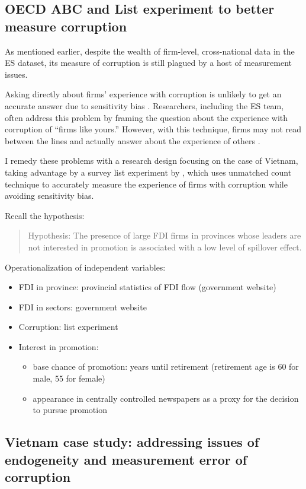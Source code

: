 \subsection{OECD ABC and List experiment to better measure corruption}

As mentioned earlier, despite the wealth of firm-level, cross-national data in the ES dataset, its measure of corruption is still plagued by a host of measurement issues. 

Asking directly about firms' experience with corruption is unlikely to get an accurate answer due to sensitivity bias \citep{Coutts2011}. Researchers, including the ES team, often address this problem by framing the question about the experience with corruption of ``firms like yours.'' However, with this technique, firms may not read between the lines and actually answer about the experience of others \citep{Ahart2004}.

I remedy these problems with a research design focusing on the case of Vietnam, taking advantage by a survey list experiment by \citet{Malesky2015}, which uses unmatched count technique to accurately measure the experience of firms with corruption while avoiding sensitivity bias.

Recall the hypothesis:

\begin{quote}
Hypothesis: The presence of large FDI firms in provinces whose leaders are not interested in promotion is associated with a low level of spillover effect.
\end{quote}

Operationalization of independent variables:
\begin{itemize}
\item FDI in province: provincial statistics of FDI flow (government website)
\item FDI in sectors: government website
\item Corruption: list experiment \citep{Malesky2015}
\item Interest in promotion: 
\begin{itemize}
	\item base chance of promotion: years until retirement (retirement age is 60 for male, 55 for female)
	\item appearance in centrally controlled newspapers as a proxy for the decision to pursue promotion
\end{itemize}
\end{itemize}


\subsection{Vietnam case study: addressing issues of endogeneity and measurement error of corruption}

